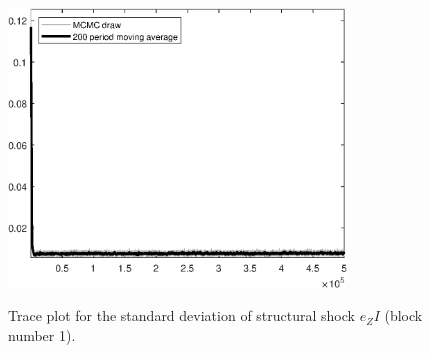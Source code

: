 \begin{figure}[H]
\centering
  \includegraphics[width=0.8\textwidth]{BRS_growth_ext_shopping/graphs/TracePlot_SE_e_ZI_blck_1}\\
    \caption{Trace plot for the standard deviation of structural shock ${e_ZI}$ (block number 1).}
\end{figure}
